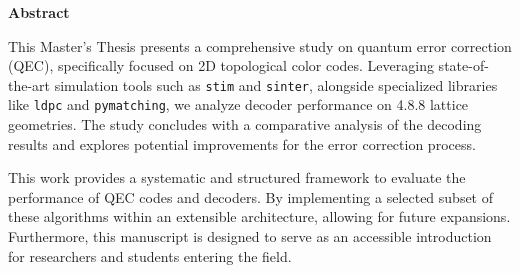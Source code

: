 {\centering\Large\bfseries\color{nebrijared}Abstract\par}
\fontsize{11}{13}\selectfont
\vspace{\baselineskip}
This Master's Thesis presents a comprehensive study on quantum error correction (QEC), specifically focused on 2D topological color codes. Leveraging state-of-the-art simulation tools such as \texttt{stim} and \texttt{sinter}, alongside specialized libraries like \texttt{ldpc} and \texttt{pymatching}, we analyze decoder performance on 4.8.8 lattice geometries. The study concludes with a comparative analysis of the decoding results and explores potential improvements for the error correction process.

\vspace{\baselineskip}

This work provides a systematic and structured framework to evaluate the performance of QEC codes and decoders. By implementing a selected subset of these algorithms within an extensible architecture, allowing for future expansions. Furthermore, this manuscript is designed to serve as an accessible introduction for researchers and students entering the field.
